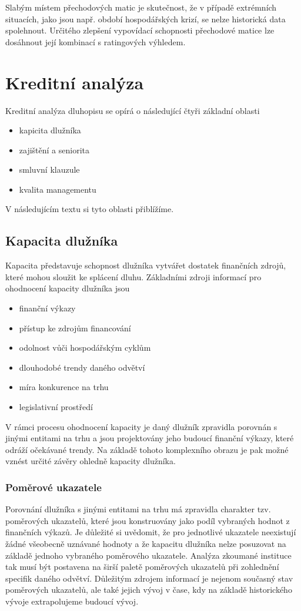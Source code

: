 \documentclass[a4paper]{book}
\begin{document}
Slabým místem přechodových matic je skutečnost, že v případě extrémních situacích, jako jsou např. období hospodářských krizí, se nelze historická data spolehnout. Určitého zlepšení vypovídací schopnosti přechodové matice lze dosáhnout její kombinací s ratingových výhledem.

\section{Kreditní analýza}

Kreditní analýza dluhopisu se opírá o následující čtyři základní oblasti
\begin{itemize}
\item kapicita dlužníka
\item zajištění a seniorita
\item smluvní klauzule
\item kvalita managementu
\end{itemize}
V následujícím textu si tyto oblasti přiblížíme.

\subsection{Kapacita dlužníka}

Kapacita představuje schopnost dlužníka vytvářet dostatek finančních zdrojů, které mohou sloužit ke splácení dluhu. Základními zdroji informací pro ohodnocení kapacity dlužníka jsou
\begin{itemize}
\item finanční výkazy
\item přístup ke zdrojům financování
\item odolnost vůči hospodářským cyklům
\item dlouhodobé trendy daného odvětví
\item míra konkurence na trhu
\item legislativní prostředí
\end{itemize}
V rámci procesu ohodnocení kapacity je daný dlužník zpravidla porovnán s jinými entitami na trhu a jsou projektovány jeho budoucí finanční výkazy, které odráží očekávané trendy. Na základě tohoto komplexního obrazu je pak možné vznést určité závěry ohledně kapacity dlužníka.

\subsubsection{Poměrové ukazatele}

Porovnání dlužníka s jinými entitami na trhu má zpravidla charakter tzv. poměrových ukazatelů, které jsou konstruovány jako podíl vybraných hodnot z finančních výkazů. Je důležité si uvědomit, že pro jednotlivé ukazatele neexistují žádné všeobecně uznávané hodnoty a že kapacitu dlužníka nelze posuzovat na základě jednoho vybraného poměrového ukazatele. Analýza zkoumané instituce tak musí být postavena na širší paletě poměrových ukazatelů při zohlednění specifik daného odvětví. Důležitým zdrojem informací je nejenom současný stav poměrových ukazatelů, ale také jejich vývoj v čase, kdy na základě historického vývoje extrapolujeme budoucí vývoj.\\
\end{document}
